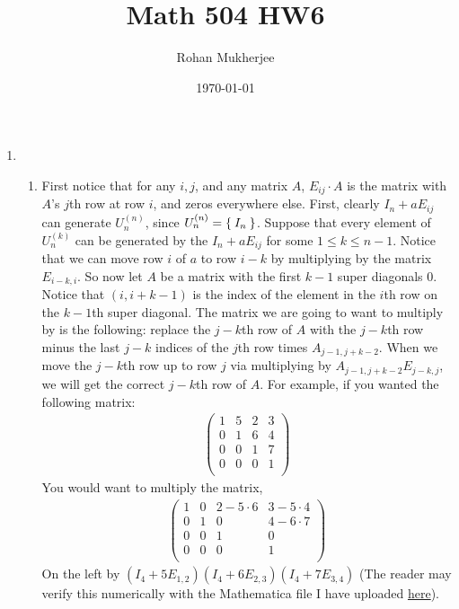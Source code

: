 \documentclass[12pt]{article}
\title{Math 504 HW6}
\date{\today}
\author{Rohan Mukherjee}
\theoremstyle{definitionstyle}
\begin{document}
	\maketitle
	\begin{enumerate}[leftmargin=\labelsep]
		\item \begin{enumerate}
			\item First notice that for any $i, j$, and any matrix $A$, $E_{ij} \cdot A$ is the matrix with $A$'s $j$th row at row $i$, and zeros everywhere else. First, clearly $I_n + aE_{ij}$ can generate $U_{n}^{(n)}$, since $U_{n}^{(n)} = \Set{I_n}$. Suppose that every element of $U_n^{(k)}$ can be generated by the $I_n+aE_{ij}$ for some $1 \leq k \leq n-1$. Notice that we can move row $i$ of $a$ to row $i-k$ by multiplying by the matrix $E_{i-k, i}$. So now let $A$ be a matrix with the first $k-1$ super diagonals 0. Notice that $(i, i+k-1)$ is the index of the element in the $i$th row on the $k-1$th super diagonal. The matrix we are going to want to multiply by is the following: replace the $j-k$th row of $A$ with the $j-k$th row minus the last $j-k$ indices of the $j$th row times $A_{j-1, j+k-2}$. When we move the $j-k$th row up to row $j$ via multiplying by $A_{j-1, j+k-2}E_{j-k, j}$, we will get the correct $j-k$th row of $A$. For example, if you wanted the following matrix:
			\begin{align*}
				\begin{pmatrix}
					1 & 5 & 2 & 3 \\
					0 & 1 & 6 & 4 \\
					0 & 0 & 1 & 7 \\
					0 & 0 & 0 & 1 \\
				\end{pmatrix}
			\end{align*}
			You would want to multiply the matrix,
			\begin{align*}
				\begin{pmatrix}
					1 & 0 & 2 -5 \cdot 6 & 3 -5 \cdot 4 \\
					0 & 1 & 0 & 4 - 6 \cdot 7 \\
					0 & 0 & 1 & 0 \\
					0 & 0 & 0 & 1 \\
				\end{pmatrix}
			\end{align*}
			On the left by $(I_4+5E_{1, 2}) (I_4+6E_{2, 3}) (I_4+7E_{3, 4})$ (The reader may verify this numerically with the Mathematica file I have uploaded \href{https://drive.google.com/file/d/1MiflAJ1e5NkwCVJLpRHAQiuZEdhskZNq/view?usp=sharing}{here}).
			

\end{enumerate}
\end{enumerate}
\end{document}
